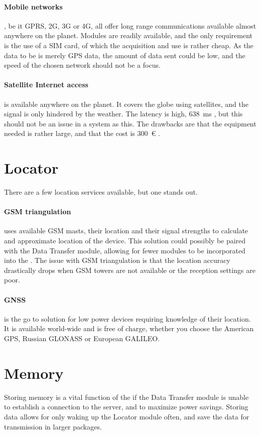 \paragraph{Mobile networks}, be it GPRS, 2G, 3G or 4G, all offer long range communications available almost anywhere on the planet.
Modules are readily available, and the only requirement is the use of a SIM card, of which the acquisition and use is rather cheap.
As the data to be is merely GPS data, the amount of data sent could be low, and the speed of the chosen network should not be a focus.
\paragraph{Satellite Internet access} is available anywhere on the planet.
It covers the globe using satellites, and the signal is only hindered by the weather.
The latency is high, \SI{638}{\milli\second} \cite{wiki:satellite}, but this should not be an issue in a system as this.
The drawbacks are that the equipment needed is rather large, and that the cost is \SI{300}{€} \cite{wiki:satellite}.

\section{Locator}
There are a few location services available, but one stands out.
\paragraph{GSM triangulation} uses available GSM masts, their location and their signal strengths to calculate and approximate location of the device.
This solution could possibly be paired with the Data Transfer module, allowing for fewer modules to be incorporated into the \systemName.
The issue with GSM triangulation is that the location accuracy drastically drops when GSM towers are not available or the reception settings are poor.
\paragraph{GNSS} is the go to solution for low power devices requiring knowledge of their location.
It is available world-wide and is free of charge, whether you choose the American GPS, Russian GLONASS or European GALILEO.

\section{Memory}
Storing memory is a vital function of the \systemName if the Data Transfer module is unable to establish a connection to the server, and to maximize power savings.
Storing data allows for only waking up the Locator module often, and save the data for transmission in larger packages.
